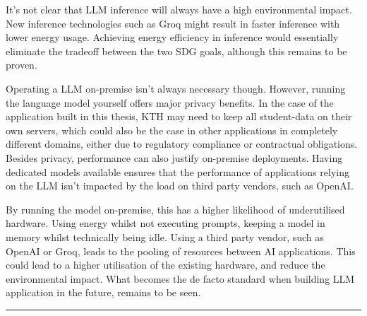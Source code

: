 It’s not clear that \gls{LLM} inference will always have a high environmental impact. New inference technologies such as Groq \cite{abts_software-defined_2022} might result in faster inference with lower energy usage. Achieving energy efficiency in inference would essentially eliminate the tradeoff between the two \gls{SDG} goals, although this remains to be proven.


Operating a \gls{LLM} on-premise isn't always necessary though. However, running the language model yourself offers major privacy benefits. In the case of the application built in this thesis, KTH may need to keep all student-data on their own servers, which could also be the case in other applications in completely different domains, either due to regulatory compliance or contractual obligations. Besides privacy, performance can also justify on-premise deployments. Having dedicated models available ensures that the performance of applications relying on the \gls{LLM} isn't impacted by the load on third party vendors, such as OpenAI.


By running the model on-premise, this has a higher likelihood of underutilised hardware. Using energy whilst not executing prompts, keeping a model in memory whilst technically being idle. Using a third party vendor, such as OpenAI or Groq, leads to the pooling of resources between AI applications. This could lead to a higher utilisation of the existing hardware, and reduce the environmental impact. What becomes the de facto standard when building \gls{LLM} application in the future, remains to be seen.


\noindent\rule{\textwidth}{0.4mm}




\cleardoublepage